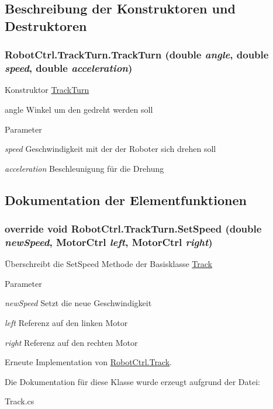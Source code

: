 \subsection{Beschreibung der Konstruktoren und Destruktoren}
\hypertarget{class_robot_ctrl_1_1_track_turn_a734b50f5f72a3521d15855b0f86d2c6c}{
\subsubsection[{TrackTurn}]{\setlength{\rightskip}{0pt plus 5cm}RobotCtrl.TrackTurn.TrackTurn (double {\em angle}, \/  double {\em speed}, \/  double {\em acceleration})}}
\label{class_robot_ctrl_1_1_track_turn_a734b50f5f72a3521d15855b0f86d2c6c}
Konstruktor \hyperlink{class_robot_ctrl_1_1_track_turn}{TrackTurn}

angle Winkel um den gedreht werden soll 
\begin{DoxyParams}{Parameter}
\item[{\em speed}]Geschwindigkeit mit der der Roboter sich drehen soll \item[{\em acceleration}]Beschleunigung f\"{u}r die Drehung \end{DoxyParams}


\subsection{Dokumentation der Elementfunktionen}
\hypertarget{class_robot_ctrl_1_1_track_turn_a065e23cd313e746cb65496c9b9df0955}{
\subsubsection[{SetSpeed}]{\setlength{\rightskip}{0pt plus 5cm}override void RobotCtrl.TrackTurn.SetSpeed (double {\em newSpeed}, \/  {\bf MotorCtrl} {\em left}, \/  {\bf MotorCtrl} {\em right})}}
\label{class_robot_ctrl_1_1_track_turn_a065e23cd313e746cb65496c9b9df0955}
\"{U}berschreibt die SetSpeed Methode der Basisklasse \hyperlink{class_robot_ctrl_1_1_track}{Track}


\begin{DoxyParams}{Parameter}
\item[{\em newSpeed}]Setzt die neue Geschwindigkeit \item[{\em left}]Referenz auf den linken Motor \item[{\em right}]Referenz auf den rechten Motor \end{DoxyParams}


Erneute Implementation von \hyperlink{class_robot_ctrl_1_1_track_a9abc3ccf4bf1d9db8d461f2cb4b4b0d3}{RobotCtrl.Track}.



Die Dokumentation für diese Klasse wurde erzeugt aufgrund der Datei:\begin{DoxyCompactItemize}
\item 
Track.cs\end{DoxyCompactItemize}
